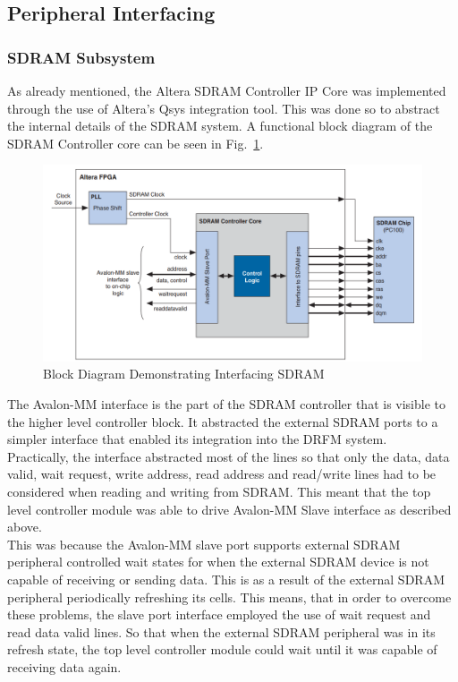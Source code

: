 	
	\subsection{Peripheral Interfacing}
		\subsubsection{SDRAM Subsystem}
		As already mentioned, the Altera SDRAM Controller IP Core \cite{SDRAM_Core} was implemented  through the use of Altera's Qsys integration tool. This was done so to abstract the internal details of the SDRAM system. A functional block diagram of the SDRAM Controller core can be seen in Fig.~\ref{fig:SDRAM_core}.
		
		\begin{figure}[h!]
			\centering
			\includegraphics[width=0.95\linewidth]{img/SDRAM}
			\caption{Block Diagram Demonstrating Interfacing SDRAM \cite{SDRAM_Core}}
			\label{fig:SDRAM_core}
		\end{figure}
		\noindent The Avalon-MM interface is the part of the SDRAM controller that is visible to the higher level controller block. It abstracted the external SDRAM ports to a simpler interface that enabled its integration into the DRFM system. \\ \newline  Practically, the interface abstracted most of the lines so that only  the data, data valid, wait request, write address, read address and read/write lines had to be considered when reading and writing from SDRAM. This meant that the top level controller module was able to drive Avalon-MM Slave interface as described above. \\ \newline This was because the Avalon-MM slave port supports external SDRAM peripheral controlled wait states for when the external SDRAM device is not capable of receiving or sending data. This is as a result of the external SDRAM peripheral periodically refreshing its cells. This means, that in order to overcome these problems, the slave port interface employed the use of wait request and read data valid lines. So that when the external SDRAM peripheral was in its refresh state, the top level controller module could wait until it was capable of receiving data again. \\
